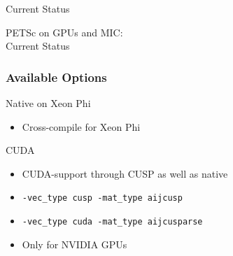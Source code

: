 

\begin{frame}{Current Status}
  \begin{center}
    \Large PETSc on GPUs and MIC: \\[1em] Current Status
  \end{center}
\end{frame}

\begin{frame}[fragile]
\frametitle{Available Options}

 \begin{minipage}{0.75\textwidth}
  \begin{block}{Native on Xeon Phi}
  \begin{itemize}
   \item Cross-compile for Xeon Phi
  \end{itemize}
  \end{block}

  \begin{block}{CUDA}
  \begin{itemize}
   \item CUDA-support through CUSP as well as native
   \item \lstinline|-vec_type cusp -mat_type aijcusp|
   \item \lstinline|-vec_type cuda -mat_type aijcusparse|
   \item Only for NVIDIA GPUs
  \end{itemize}
  \end{block}


\end{minipage}
\end{frame}
